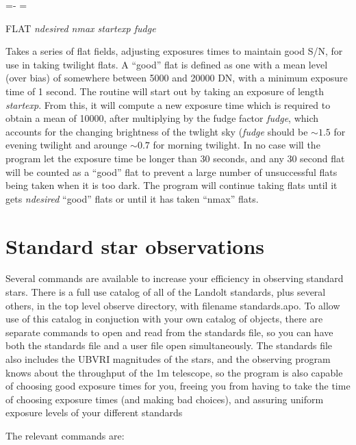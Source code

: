 \documentclass[10pt]{report}
\renewcommand{\[}{\begin{eqnarray}}
\renewcommand{\]}{\end{eqnarray}}
\newenvironment{hanging}{
	\begin{list}{}{
		\labelsep=0pt
		\labelwidth=0pt
		\listparindent=0pt
		\itemindent=-\leftmargini
		\leftmargin=\leftmargini
	}
}{
	\end{list}
}
\begin{document}
\begin{hanging}
\item{FLAT \textit{ndesired nmax startexp fudge}}

Takes a series of flat fields, adjusting exposures times to maintain good
S/N, for use in taking twilight flats. A ``good'' flat is defined as one
with a mean level (over bias) of somewhere between 5000 and 20000 DN, with
a minimum exposure time of 1 second. The
routine will start out by taking an exposure of length \textit{startexp}.
From this, it will compute a new exposure time which is required to obtain
a mean of 10000, after multiplying by the fudge factor \textit{fudge},
which accounts for the changing brightness of the twlight sky (\textit{fudge}
should be $\sim 1.5$ for evening twilight and arounge $\sim 0.7$ for
morning twilight. In no case will the program let the exposure time be longer
than 30 seconds, and any 30 second flat will be counted as a ``good'' flat
to prevent a large number of unsuccessful flats being taken when it is too
dark.  The program will continue taking flats until it gets
\textit{ndesired} ``good'' flats or until it has taken ``nmax'' flats.


\end{hanging}

\section{Standard star observations}

Several commands are available to increase your efficiency in observing
standard stars. There is a full use catalog of all of the Landolt standards,
plus several others, in the top level observe directory, with filename
standards.apo. To allow use of this catalog in conjuction with your own
catalog of objects, there are separate commands to open and read from the
standards file, so you can have both the standards file and a user file open
simultaneously. The standards file also includes the UBVRI magnitudes of
the stars, and the observing program knows about the throughput of the
1m telescope, so the program is also capable of choosing good exposure
times for you, freeing you from having to take the time of choosing
exposure times (and making bad choices), and assuring uniform exposure
levels of your different standards

The relevant commands are:
\end{document}
